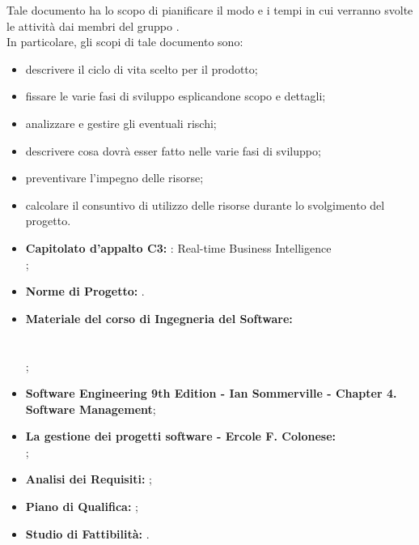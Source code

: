 
		Tale documento ha lo scopo di pianificare il modo e i tempi in cui verranno svolte le attività dai membri del gruppo \groupname{}.\\
		In particolare, gli scopi di tale documento sono:
		\begin{itemize}
			\item descrivere il ciclo di vita scelto per il prodotto;
			\item fissare le varie fasi di sviluppo esplicandone scopo e dettagli;
			\item analizzare e gestire gli eventuali rischi;
			\item descrivere cosa dovrà esser fatto nelle varie fasi di sviluppo;
			\item preventivare l'impegno delle risorse;
			\item calcolare il consuntivo di utilizzo delle risorse durante lo svolgimento del progetto.
		\end{itemize}
	
		

			\begin{itemize}
				\item \textbf{Capitolato d'appalto C3:} \projectname{}: Real-time Business Intelligence \\
					;
				\item \textbf{Norme di Progetto:} .
			\end{itemize}
			\begin{itemize}
				\item \textbf{Materiale del corso di Ingegneria del Software:} \\
					\\
					\\
					;
				\item \textbf{Software Engineering 9th Edition - Ian Sommerville - Chapter 4. Software Management};
				\item \textbf{La gestione dei progetti software - Ercole F. Colonese:} \\
					;
				\item \textbf{Analisi dei Requisiti:} ;
				\item \textbf{Piano di Qualifica:} ;
				\item \textbf{Studio di Fattibilità:} .
			\end{itemize}
